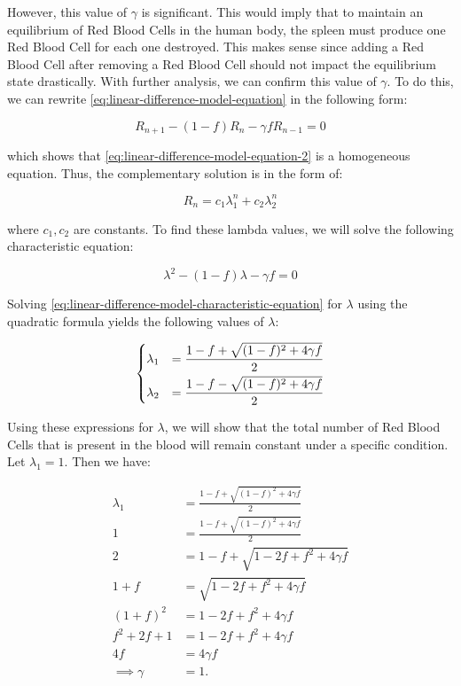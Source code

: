 However, this value of $\gamma$ is significant. This would imply that to maintain an equilibrium of Red Blood Cells in the human body, the spleen must produce one Red Blood Cell for each one destroyed. This makes sense since adding a Red Blood Cell after removing a Red Blood Cell should not impact the equilibrium state drastically. With further analysis, we can confirm this value of $\gamma$. To do this, we can rewrite \eqref{eq:linear-difference-model-equation} in the following form:

\begin{equation}
    R_{n+1} - (1-f)R_n - \gamma fR_{n-1} = 0
    \label{eq:linear-difference-model-equation-2}
\end{equation}

which shows that \eqref{eq:linear-difference-model-equation-2} is a homogeneous equation. Thus, the complementary solution is in the form of:

\begin{equation*}
    R_n = c_1\lambda_1^n + c_2\lambda_2^n
\end{equation*}

where $c_1,c_2$ are constants. To find these lambda values, we will solve the following characteristic equation:

\begin{equation}
    \lambda^2 - (1 - f)\lambda - \gamma f = 0
    \label{eq:linear-difference-model-characteristic-equation}
\end{equation}

Solving \eqref{eq:linear-difference-model-characteristic-equation} for $\lambda$ using the quadratic formula yields the following values of $\lambda$:

\[
\begin{dcases}
    \lambda_1 &= \frac{1-f + \sqrt{(1-f)^2 + 4\gamma f}}{2}\\
    \lambda_2 &= \frac{1-f - \sqrt{(1-f)^2 + 4\gamma f}}{2}
\end{dcases}
\]

Using these expressions for $\lambda$, we will show that the total number of Red Blood Cells that is present in the blood will remain constant under a specific condition. Let $\lambda_1=1$. Then we have:

\begin{align*}
    \lambda_1 &= \frac{1-f + \sqrt{(1-f)^2 + 4\gamma f}}{2}\\
    1 &= \frac{1-f + \sqrt{(1-f)^2 + 4\gamma f}}{2}\\
    2 &= 1-f + \sqrt{1 - 2f + f^2 + 4\gamma f}\\
    1 + f &= \sqrt{1 - 2f + f^2 + 4\gamma f}\\
    (1 + f)^2 &= 1 - 2f + f^2 + 4\gamma f\\
    f^2 + 2f + 1 &= 1 - 2f + f^2 + 4\gamma f\\
    4f &= 4\gamma f\\
    \implies\gamma &= 1.
\end{align*}

